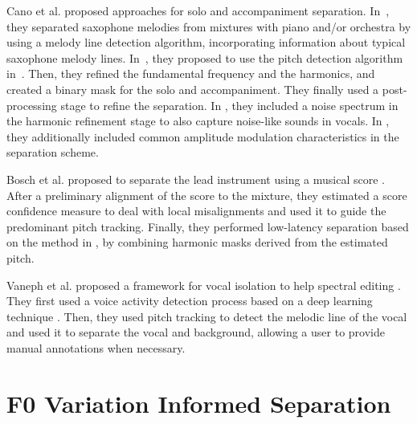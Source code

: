 Cano et al. proposed approaches for solo and accompaniment separation. In~\cite{cano09}, they separated saxophone melodies from mixtures with piano and/or orchestra by using a melody line detection algorithm, incorporating information about typical saxophone melody lines. In~\cite{grollmisch11,dittmar12,cano12}, they proposed to use the pitch detection algorithm in~\cite{dressler11}. Then, they refined the fundamental frequency and the harmonics, and created a binary mask for the solo and accompaniment. They finally used a post-processing stage to refine the separation. In \cite{cano13}, they included a noise spectrum in the harmonic refinement stage to also capture noise-like sounds in vocals. In \cite{cano14}, they additionally included common amplitude modulation characteristics in the separation scheme.
\par
Bosch et al. proposed to separate the lead instrument using a musical score \cite{bosch12}. After a preliminary alignment of the score to the mixture, they estimated a score confidence measure to deal with local misalignments and used it to guide the predominant pitch tracking. Finally, they performed low-latency separation based on the method in \cite{marxer12}, by combining harmonic masks derived from the estimated pitch.
\par
Vaneph et al. proposed a framework for vocal isolation to help spectral editing \cite{vaneph16}. They first used a voice activity detection process based on a deep learning technique \cite{Leglaive15}. Then, they used pitch tracking to detect the melodic line of the vocal and used it to separate the vocal and background, allowing a user to provide manual annotations when necessary.

\section{F0 Variation Informed Separation}
\label{sub:frequency_modulation}


